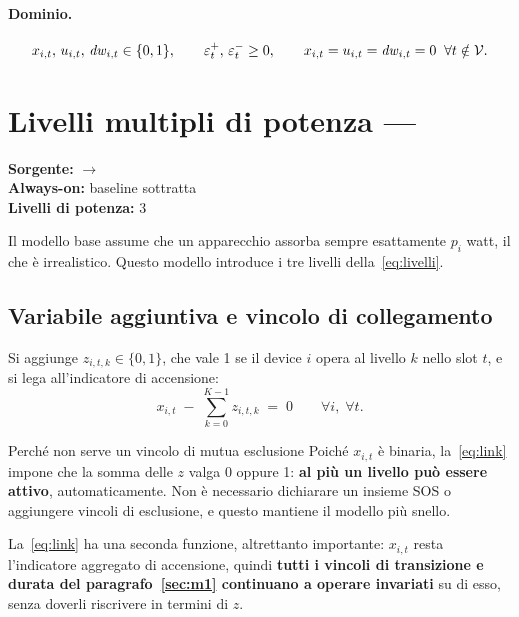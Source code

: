 \paragraph{Dominio.}
\begin{equation}
  x_{i,t},\, u_{i,t},\, \mathit{dw}_{i,t} \in \{0,1\},
  \qquad \varepsilon^{+}_t,\, \varepsilon^{-}_t \ge 0,
  \qquad x_{i,t} = u_{i,t} = \mathit{dw}_{i,t} = 0 \;\; \forall t \notin \mathcal{V} .
\end{equation}

\section{Livelli multipli di potenza --- }
\label{sec:m2}

\noindent\textbf{Sorgente:}  $\rightarrow$ \\
\textbf{Always-on:} baseline sottratta\\
\textbf{Livelli di potenza:} 3

Il modello base assume che un apparecchio assorba sempre esattamente $p_i$ watt, il che è
irrealistico. Questo modello introduce i tre livelli della~\eqref{eq:livelli}.

\subsection*{Variabile aggiuntiva e vincolo di collegamento}

Si aggiunge $z_{i,t,k} \in \{0,1\}$, che vale 1 se il device $i$ opera al livello $k$ nello slot
$t$, e si lega all'indicatore di accensione:
\begin{equation}
  x_{i,t} \;-\; \sum_{k=0}^{K-1} z_{i,t,k} \;=\; 0
  \qquad \forall i,\; \forall t .
  \label{eq:link}
\end{equation}

\begin{notebox}{Perché non serve un vincolo di mutua esclusione}
Poiché $x_{i,t}$ è binaria, la~\eqref{eq:link} impone che la somma delle $z$ valga 0 oppure 1:
\textbf{al più un livello può essere attivo}, automaticamente. Non è necessario dichiarare un
insieme SOS o aggiungere vincoli di esclusione, e questo mantiene il modello più snello.
\end{notebox}

La~\eqref{eq:link} ha una seconda funzione, altrettanto importante: $x_{i,t}$ resta l'indicatore
aggregato di accensione, quindi \textbf{tutti i vincoli di transizione e durata del
paragrafo~\ref{sec:m1} continuano a operare invariati} su di esso, senza doverli riscrivere in
termini di $z$.

